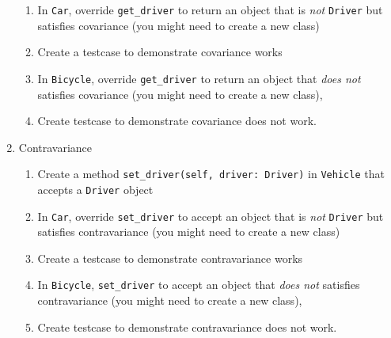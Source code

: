 \documentclass[oneside,11pt,dvipsnames]{book}
\newcommand{\code}[1]{\texttt{#1}}
\begin{document}
\begin{enumerate}
\begin{enumerate}
        \item In \code{Car}, override \code{get\_driver} to return an object that is \emph{not} \code{Driver} but satisfies covariance (you might need to create a new class)
        \item Create a testcase to demonstrate covariance works 
        \item In \code{Bicycle}, override \code{get\_driver} to return an object that \emph{does not} satisfies covariance (you might need to create a new class), \item Create testcase to demonstrate covariance does not work.
    \end{enumerate}    
    \item Contravariance
    \begin{enumerate}
        \item Create a method \code{set\_driver(self, driver: Driver)} in \code{Vehicle} that accepts a \code{Driver} object
        \item In \code{Car}, override \code{set\_driver} to accept an object that is \emph{not} \code{Driver} but satisfies contravariance (you might need to create a new class)
        \item Create a testcase to demonstrate contravariance works
        \item In \code{Bicycle}, \code{set\_driver} to accept an object that \emph{does not} satisfies contravariance (you might need to create a new class),
        \item Create testcase to demonstrate contravariance does not work.
    \end{enumerate}
\end{enumerate}




\end{document}

